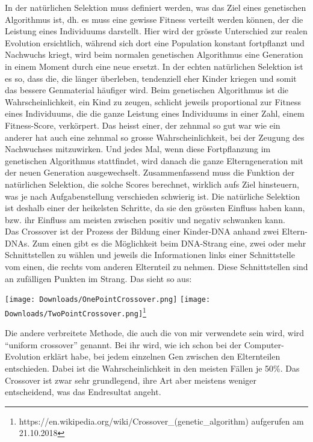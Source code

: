 \documentclass[10pt,a4paper,ngerman,english]{article}
\begin{document}
In der natürlichen Selektion muss definiert werden, was das Ziel eines genetischen Algorithmus ist, dh. es muss eine gewisse Fitness verteilt werden können, der die Leistung eines Individuums darstellt. Hier wird der grösste Unterschied zur realen Evolution ersichtlich, während sich dort eine Population konstant fortpflanzt und Nachwuchs kriegt, wird beim normalen genetischen Algorithmus eine Generation in einem Moment durch eine neue ersetzt. In der echten natürlichen Selektion ist es so, dass die, die länger überleben, tendenziell eher Kinder kriegen und somit das bessere Genmaterial häufiger wird. Beim genetischen Algorithmus ist die Wahrscheinlichkeit, ein Kind zu zeugen, schlicht jeweils proportional zur Fitness eines Individuums, die die ganze Leistung eines Individuums in einer Zahl, einem Fitness-Score, verkörpert. Das heisst einer, der zehnmal so gut war wie ein anderer hat auch eine zehnmal so grosse Wahrscheinlichkeit, bei der Zeugung des Nachwuchses mitzuwirken. Und jedes Mal, wenn diese Fortpflanzung im genetischen Algorithmus stattfindet, wird danach die ganze Elterngeneration mit der neuen Generation ausgewechselt. Zusammenfassend muss die Funktion der natürlichen Selektion, die solche Scores berechnet, wirklich aufs Ziel hinsteuern, was je nach Aufgabenstellung verschieden schwierig ist. Die natürliche Selektion ist deshalb einer der heikelsten Schritte, da sie den grössten Einfluss haben kann, bzw. ihr Einfluss am meisten zwischen positiv und negativ schwanken kann.\\

Das Crossover ist der Prozess der Bildung einer Kinder-DNA anhand zwei Eltern-DNAs. Zum einen gibt es die Möglichkeit beim DNA-Strang eine, zwei oder mehr Schnittstellen zu wählen und jeweils die Informationen links einer Schnittstelle vom einen, die rechts vom anderen Elternteil zu nehmen. Diese Schnittstellen sind an zufälligen Punkten im Strang. Das sieht so aus:

\begin{center}
\texttt{[image: Downloads/OnePointCrossover.png]}
\texttt{[image: Downloads/TwoPointCrossover.png]}\footnote{https://en.wikipedia.org/wiki/Crossover\_(genetic\_algorithm) aufgerufen am 21.10.2018}
\end{center}

Die andere verbreitete Methode, die auch die von mir verwendete sein wird, wird \enquote{uniform crossover} genannt. Bei ihr wird, wie ich schon bei der Computer-Evolution erklärt habe, bei jedem einzelnen Gen zwischen den Elternteilen entschieden. Dabei ist die Wahrscheinlichkeit in den meisten Fällen je 50\%. Das Crossover ist zwar sehr grundlegend, ihre Art aber meistens weniger entscheidend, was das Endresultat angeht.\\
\end{document}
